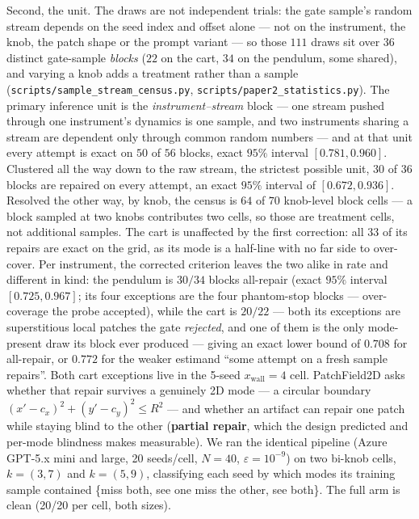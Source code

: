 \documentclass[11pt]{article}
\theoremstyle{definition}
\theoremstyle{remark}
\begin{document}
Second, the unit. The draws are not independent trials: the gate sample's random stream depends on the seed index and offset alone --- not on the instrument, the knob, the patch shape or the prompt variant --- so those $111$ draws sit over $36$ distinct gate-sample \emph{blocks} ($22$ on the cart, $34$ on the pendulum, some shared), and varying a knob adds a treatment rather than a sample (\texttt{scripts/\allowbreak sample\_\allowbreak stream\_\allowbreak census.py}, \texttt{scripts/\allowbreak paper2\_\allowbreak statistics.py}). The primary inference unit is the \emph{instrument--stream} block --- one stream pushed through one instrument's dynamics is one sample, and two instruments sharing a stream are dependent only through common random numbers --- and at that unit every attempt is exact on $50$ of $56$ blocks, exact $95\%$ interval $[0.781, 0.960]$. Clustered all the way down to the raw stream, the strictest possible unit, $30$ of $36$ blocks are repaired on every attempt, an exact $95\%$ interval of $[0.672, 0.936]$. Resolved the other way, by knob, the census is $64$ of $70$ knob-level block cells --- a block sampled at two knobs contributes two cells, so those are treatment cells, not additional samples. The cart is unaffected by the first correction: all $33$ of its repairs are exact on the grid, as its mode is a half-line with no far side to over-cover. Per instrument, the corrected criterion leaves the two alike in rate and different in kind: the pendulum is $30/34$ blocks all-repair (exact $95\%$ interval $[0.725, 0.967]$; its four exceptions are the four phantom-stop blocks --- over-coverage the probe accepted), while the cart is $20/22$ --- both its exceptions are superstitious local patches the gate \emph{rejected}, and one of them is the only mode-present draw its block ever produced --- giving an exact lower bound of $0.708$ for all-repair, or $0.772$ for the weaker estimand ``some attempt on a fresh sample repairs''. Both cart exceptions live in the 5-seed $x_\mathrm{wall} = 4$ cell. PatchField2D asks whether that repair survives a genuinely 2D mode --- a circular boundary $(x'-c_x)^2 + (y'-c_y)^2 \le R^2$ --- and whether an artifact can repair one patch while staying blind to the other (\textbf{partial repair}, which the design predicted and per-mode blindness makes measurable). We ran the identical pipeline (Azure GPT-5.x mini and large, 20 seeds/cell, $N = 40$, $\varepsilon = 10^{-9}$) on two bi-knob cells, $k = (3,7)$ and $k = (5,9)$, classifying each seed by which modes its training sample contained \{miss both, see one miss the other, see both\}. The full arm is clean (20/20 per cell, both sizes).
\end{document}
